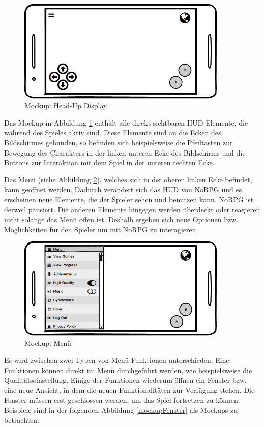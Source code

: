 			\begin{figure}[htbp]
				\centering 
				\label{mockupHUD}
				\includegraphics[width=10cm]{pics/HUD.png}
				\caption{Mockup: Head-Up Display}
			\end{figure}
			
			Das Mockup in Abbildung \ref{mockupHUD} enthält alle direkt sichtbaren \ac{HUD} Elemente, die während des Spieles aktiv sind. Diese Elemente sind an die Ecken des Bildschirmes gebunden, so befinden sich beispielsweise die Pfeiltasten zur Bewegung des Charakters in der linken unteren Ecke des Bildschirms und die Buttons zur Interaktion mit dem Spiel in der unteren rechten Ecke. 
			
			Das Menü (siehe Abbildung \ref{mockupMenu}), welches sich in der oberen linken Ecke befindet, kann geöffnet werden. Dadurch verändert sich das \ac{HUD} von NoRPG und es erscheinen neue Elemente, die der Spieler sehen und benutzen kann. NoRPG ist derweil pausiert. Die anderen Elemente hingegen werden überdeckt oder reagieren nicht solange das Menü offen ist. Deshalb ergeben sich neue Optionen bzw. Möglichkeiten für den Spieler um mit NoRPG zu interagieren.
			
			\begin{figure}[htbp]
				\centering 
				\label{mockupMenu}
				\includegraphics[width=10cm]{pics/Menu.png}
				\caption{Mockup: Menü}
			\end{figure}
			
			Es wird zwischen zwei Typen von Menü-Funktionen unterschieden. Eine Funktionen können direkt im Menü durchgeführt werden, wie beispielsweise die Qualitätseinstellung. Einige der Funktionen wiederum öffnen ein Fenster bzw. eine neue Ansicht, in dem die neuen Funktionalitäten zur Verfügung stehen. Die Fenster müssen erst geschlossen werden, um das Spiel fortsetzen zu können. Beispiele sind in der folgenden Abbildung \ref{mockupFenster} als Mockups zu betrachten.
			
